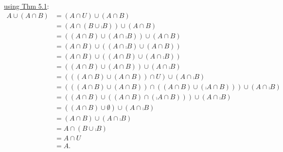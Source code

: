 \documentclass[11pt]{book}
\begin{document}
\begin{enumerate}
{\begin{enumerate}
\underline{using Thm 5.1}: \begin{align*}A \cup (A \cap B) &= (A \cap U) \cup (A \cap B)\tag{5.1.4'}\\&= (A \cap (B \cup \comp{B})) \cup (A \cap B)\tag{5.1.5}\\&= ((A \cap B) \cup (A \cap \comp{B})) \cup (A \cap B)\tag{5.1.3'}\\&= (A \cap B) \cup ((A \cap \comp{B}) \cup (A \cap B))\tag{5.1.1}\\&= (A \cap B) \cup ((A \cap B) \cup (A \cap \comp{B}))\tag{5.1.2}\\&= ((A \cap B) \cup (A \cap B)) \cup (A \cap \comp{B})\tag{5.1.1}\\&= (((A \cap B) \cup (A \cap B)) \cap U) \cup (A \cap \comp{B})\tag{5.1.4'}\\&=  (((A \cap B) \cup (A \cap B)) \cap ((A \cap B) \cup (\comp{A \cap B}))) \cup (A \cap \comp{B})\tag{5.1.5}\\&= ((A \cap B) \cup ((A \cap B) \cap (\comp{A \cap B}))) \cup (A \cap \comp{B})\tag{5.1.3}\\&= ((A \cap B) \cup \emptyset) \cup (A \cap \comp{B})\tag{5.1.5'}\\&= (A \cap B) \cup (A \cap \comp{B})\tag{5.1.4}\\&= A \cap (B \cup \comp{B})\tag{5.1.3'}\\&= A \cap U\tag{5.1.5}\\&= A.\tag{5.1.4'}\end{align*}
\end{enumerate}}


\end{enumerate}
\end{document}
